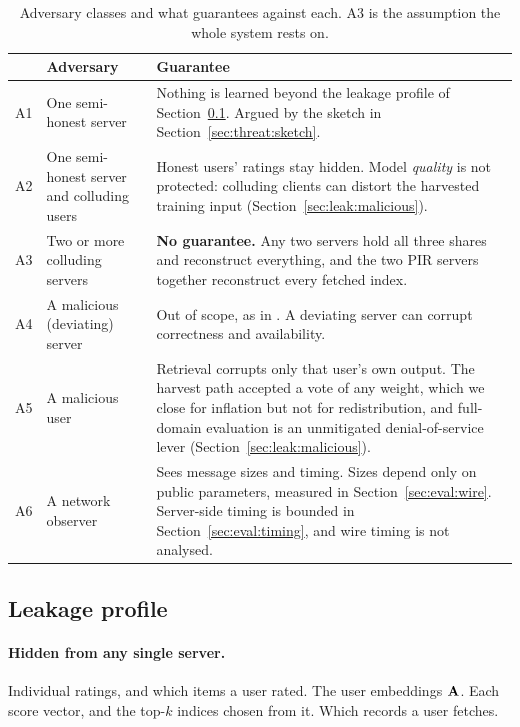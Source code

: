 \begin{table}[t]
\centering
\small
\caption{Adversary classes and what \sys{} guarantees against each. A3 is the
assumption the whole system rests on.}
\label{tab:adversaries}
\begin{tabular}{@{}l p{3.6cm} p{9.2cm}@{}}
\toprule
 & Adversary & Guarantee \\
\midrule
A1 & One semi-honest server & Nothing is learned beyond the leakage profile of
  Section~\ref{sec:threat:leakage}. Argued by the sketch in
  Section~\ref{sec:threat:sketch}. \\
A2 & One semi-honest server and colluding users & Honest users' ratings stay
  hidden. Model \emph{quality} is not protected: colluding clients can distort
  the harvested training input (Section~\ref{sec:leak:malicious}). \\
A3 & Two or more colluding servers & \textbf{No guarantee.} Any two servers hold
  all three shares and reconstruct everything, and the two PIR servers together
  reconstruct every fetched index. \\
A4 & A malicious (deviating) server & Out of scope, as in \nudgeplain{}. A
  deviating server can corrupt correctness and availability. \\
A5 & A malicious user & Retrieval corrupts only that user's own output. The
  harvest path accepted a vote of any weight, which we close for inflation but
  not for redistribution, and full-domain evaluation is an unmitigated
  denial-of-service lever (Section~\ref{sec:leak:malicious}). \\
A6 & A network observer & Sees message sizes and timing. Sizes depend only on
  public parameters, measured in Section~\ref{sec:eval:wire}. Server-side timing
  is bounded in Section~\ref{sec:eval:timing}, and wire timing is not
  analysed. \\
\bottomrule
\end{tabular}
\end{table}

\subsection{Leakage profile}
\label{sec:threat:leakage}

\paragraph{Hidden from any single server.} Individual ratings, and which items a
user rated. The user embeddings $\mathbf{A}$. Each score vector, and the top-$k$
indices chosen from it. Which records a user fetches.

